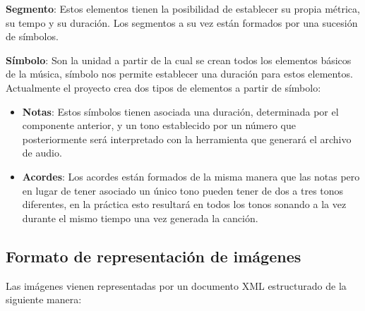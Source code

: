 \textbf{Segmento}: Estos elementos tienen la posibilidad de establecer su propia métrica, su tempo y su duración. Los segmentos a su vez están formados por una sucesión de símbolos.
\newline

\textbf{Símbolo}: Son la unidad a partir de la cual se crean todos los elementos básicos de la música, símbolo nos permite establecer una duración para estos elementos. Actualmente el proyecto crea dos tipos de elementos a partir de símbolo:
\begin{itemize}
\item \textbf{Notas}: Estos símbolos tienen asociada una duración, determinada por el componente anterior, y un tono establecido por un número que posteriormente será interpretado con la herramienta que generará el archivo de audio.
\item \textbf{Acordes}: Los acordes están formados de la misma manera que las notas pero en lugar de tener asociado un único tono pueden tener de dos a tres tonos diferentes, en la práctica esto resultará en todos los tonos sonando a la vez durante el mismo tiempo una vez generada la canción.
\end{itemize}
 
\subsection{Formato de representación de imágenes}

Las imágenes vienen representadas por un documento XML  estructurado de la siguiente manera:

